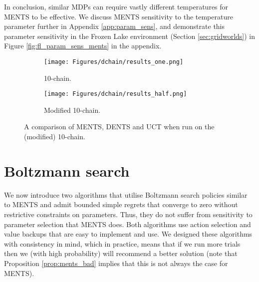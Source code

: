 \documentclass{article}
\theoremstyle{plain}
\begin{document}
    In conclusion, similar MDPs can require vastly different temperatures for MENTS to be effective. We discuss MENTS sensitivity to the temperature parameter further in Appendix \ref{app:param_sens}, and demonstrate this parameter sensitivity in the Frozen Lake environment (Section \ref{sec:gridworlds}) in Figure \ref{fig:fl_param_sens_ments} in the appendix. 
    \begin{figure}
        \begin{subfigure}[b]{0.49\textwidth}
            \centering
            \texttt{[image: Figures/dchain/results\_one.png]}
            \caption{10-chain.}
            \label{fig:10_chain_results}
        \end{subfigure}
        \hfill
        \begin{subfigure}[b]{0.49\textwidth}
            \centering
            \texttt{[image: Figures/dchain/results\_half.png]}
            \caption{Modified 10-chain.}
            \label{fig:modified_10_chain_results}
        \end{subfigure}
        \caption{A comparison of MENTS, DENTS and UCT when run on the (modified) 10-chain.}
        \label{fig:dchain_graphs}
    \end{figure}



    

\section{Boltzmann search} \label{sec:boltzmann_search}
    We now introduce two algorithms that utilise Boltzmann search policies similar to MENTS and admit bounded simple regrets that converge to zero without restrictive constraints on parameters.
    Thus, they do not suffer from sensitivity to parameter selection that MENTS does. Both algorithms use action selection and value backups that are easy to implement and use.   
    We designed these algorithms with consistency in mind, which in practice, means that if we run more trials then we (with high probability) will recommend a better solution (note that Proposition \ref{prop:ments_bad} implies that this is not always the case for MENTS). 
\end{document}
